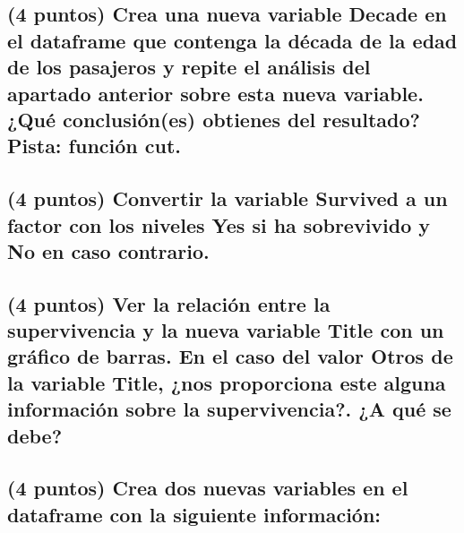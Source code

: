 \documentclass[]{article}
\begin{document}
\subsection{\texorpdfstring{(4 puntos) Crea una nueva variable
\textbf{Decade} en el dataframe que contenga la década de la edad de los
pasajeros y repite el análisis del apartado anterior sobre esta nueva
variable. ¿Qué conclusión(es) obtienes del resultado? Pista: función
cut.}{(4 puntos) Crea una nueva variable Decade en el dataframe que contenga la década de la edad de los pasajeros y repite el análisis del apartado anterior sobre esta nueva variable. ¿Qué conclusión(es) obtienes del resultado? Pista: función cut.}}\label{puntos-crea-una-nueva-variable-decade-en-el-dataframe-que-contenga-la-decada-de-la-edad-de-los-pasajeros-y-repite-el-analisis-del-apartado-anterior-sobre-esta-nueva-variable.-que-conclusiones-obtienes-del-resultado-pista-funcion-cut.}

\subsection{\texorpdfstring{(4 puntos) Convertir la variable
\textbf{Survived} a un factor con los niveles Yes si ha sobrevivido y No
en caso
contrario.}{(4 puntos) Convertir la variable Survived a un factor con los niveles Yes si ha sobrevivido y No en caso contrario.}}\label{puntos-convertir-la-variable-survived-a-un-factor-con-los-niveles-yes-si-ha-sobrevivido-y-no-en-caso-contrario.}

\subsection{\texorpdfstring{(4 puntos) Ver la relación entre la
supervivencia y la nueva variable Title con un gráfico de barras. En el
caso del valor \textbf{Otros} de la variable \textbf{Title}, ¿nos
proporciona este alguna información sobre la supervivencia?. ¿A qué se
debe?}{(4 puntos) Ver la relación entre la supervivencia y la nueva variable Title con un gráfico de barras. En el caso del valor Otros de la variable Title, ¿nos proporciona este alguna información sobre la supervivencia?. ¿A qué se debe?}}\label{puntos-ver-la-relacion-entre-la-supervivencia-y-la-nueva-variable-title-con-un-grafico-de-barras.-en-el-caso-del-valor-otros-de-la-variable-title-nos-proporciona-este-alguna-informacion-sobre-la-supervivencia.-a-que-se-debe}

\subsection{(4 puntos) Crea dos nuevas variables en el dataframe con la
siguiente
información:}\label{puntos-crea-dos-nuevas-variables-en-el-dataframe-con-la-siguiente-informacion}
\end{document}
